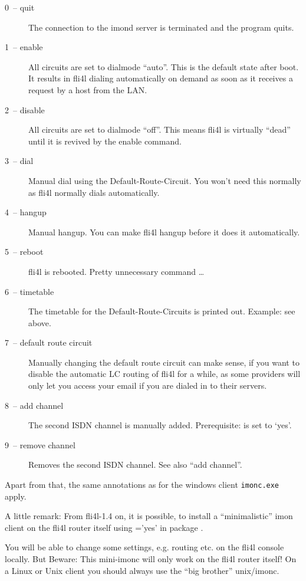  \begin{description}
  \item[0~-- quit] The connection to the imond server is terminated
    and the program quits.


  \item[1~-- enable] All circuits are set to dialmode ``auto''. This is
    the default state after boot. It results in fli4l dialing automatically
    on demand as soon as it receives a request by a host from the LAN.


  \item[2~-- disable] All circuits are set to dialmode ``off''. This means
    fli4l is virtually ``dead'' until it is revived by the enable command.


  \item[3~-- dial] Manual dial using the Default-Route-Circuit. You won't
    need this normally as fli4l normally dials automatically.


  \item[4~-- hangup] Manual hangup. You can make fli4l hangup before it does
    it automatically.


  \item[5~-- reboot] fli4l is rebooted. Pretty unnecessary command \ldots


  \item[6~-- timetable] The timetable for the Default-Route-Circuits is
    printed out. Example: see above.


  \item[7~-- default route circuit] Manually changing the default route
    circuit can make sense, if you want to disable the automatic
    LC routing of fli4l for a while, as some providers will only let you
    access your email if you are dialed in to their servers.

  \item[8~-- add channel] The second ISDN channel is manually added.
    Prerequisite:  is set to `yes'.


  \item[9~-- remove channel] Removes the second ISDN channel. See also
    ``add channel''.

  \end{description}

  \noindent Apart from that, the same annotations as for the windows client
  \verb+imonc.exe+ apply.

  A little remark: From fli4l-1.4 on, it is possible, to install a
  ``minimalistic'' imon client on the fli4l router itself using
  ='yes' in package
  .

  You will be able to change some settings, e.g. routing etc. on the fli4l
  console locally. But Beware: This mini-imonc will only work on the fli4l
  router itself! On a Linux or Unix client you should always use the
  ``big brother'' unix/imonc.
